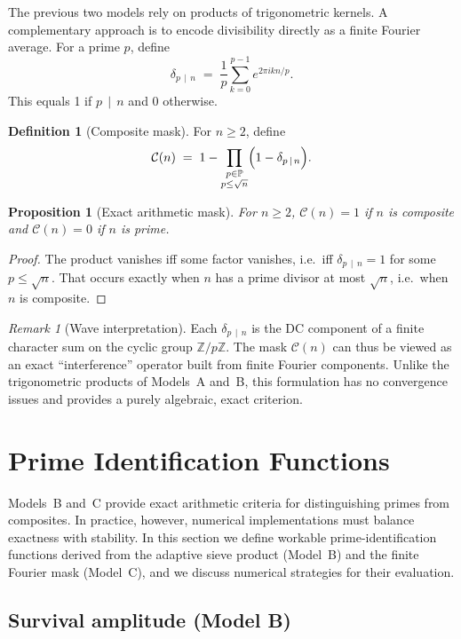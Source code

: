 \documentclass[12pt]{article}
\newtheorem{proposition}{Proposition}
\theoremstyle{definition}
\newtheorem{definition}{Definition}
\theoremstyle{remark}
\newtheorem{remark}{Remark}
\newcommand{\Z}{\mathbb{Z}}
\newcommand{\Primes}{\mathbb{P}}
\newcommand{\divides}{\,\mid\,}
\begin{document}
The previous two models rely on products of trigonometric kernels. A complementary approach is to encode divisibility directly as a finite Fourier average. For a prime \(p\), define
\[
\delta_{p\divides n}
\;=\;
\frac{1}{p}\sum_{k=0}^{p-1} e^{2\pi i k n/p}.
\]
This equals 1 if \(p \divides n\) and 0 otherwise.

\begin{definition}[Composite mask]
For \(n \ge 2\), define
\[
\mathcal{C}(n)
\;=\;
1 - \prod_{\substack{p\in\Primes\\ p\le \sqrt{n}}}
\Bigl(1 - \delta_{p\divides n}\Bigr).
\]
\end{definition}

\begin{proposition}[Exact arithmetic mask]
For \(n\ge 2\), \(\mathcal{C}(n)=1\) if \(n\) is composite and \(\mathcal{C}(n)=0\) if \(n\) is prime.
\end{proposition}
\begin{proof}
The product vanishes iff some factor vanishes, i.e.\ iff \(\delta_{p\divides n}=1\) for some \(p\le\sqrt{n}\). That occurs exactly when \(n\) has a prime divisor at most \(\sqrt{n}\), i.e.\ when \(n\) is composite.
\end{proof}

\begin{remark}[Wave interpretation]
Each \(\delta_{p\divides n}\) is the DC component of a finite character sum on the cyclic group \(\Z/p\Z\). The mask $\mathcal{C}(n)$ can thus be viewed as an exact “interference” operator built from finite Fourier components. Unlike the trigonometric products of Models~A and~B, this formulation has no convergence issues and provides a purely algebraic, exact criterion.
\end{remark}

\section{Prime Identification Functions}

Models~B and~C provide exact arithmetic criteria for distinguishing primes from composites. In practice, however, numerical implementations must balance exactness with stability. In this section we define workable prime-identification functions derived from the adaptive sieve product (Model~B) and the finite Fourier mask (Model~C), and we discuss numerical strategies for their evaluation.

\subsection{Survival amplitude (Model B)}
\end{document}
